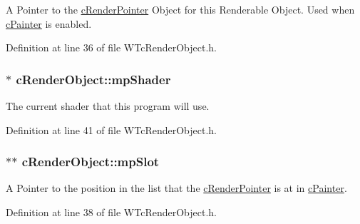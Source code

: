A Pointer to the \hyperlink{classc_render_pointer}{cRenderPointer} Object for this Renderable Object. Used when \hyperlink{classc_painter}{cPainter} is enabled. 



Definition at line 36 of file WTcRenderObject.h.

\hypertarget{classc_render_object_a0c6a3cdf86f33d1463418f49be316f1d}{
\subsubsection[{mpShader}]{$\ast$ {\bf cRenderObject::mpShader}}}
\label{classc_render_object_a0c6a3cdf86f33d1463418f49be316f1d}


The current shader that this program will use. 



Definition at line 41 of file WTcRenderObject.h.

\hypertarget{classc_render_object_a9a96382f073ecbe57b4c43c639161f6c}{
\subsubsection[{mpSlot}]{$\ast$$\ast$ {\bf cRenderObject::mpSlot}}}
\label{classc_render_object_a9a96382f073ecbe57b4c43c639161f6c}


A Pointer to the position in the list that the \hyperlink{classc_render_pointer}{cRenderPointer} is at in \hyperlink{classc_painter}{cPainter}. 



Definition at line 38 of file WTcRenderObject.h.

